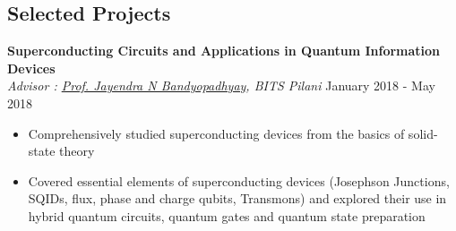 \documentclass[margin, centered, 11pt]{res}
\begin{document}
\begin{resume}


\section{Selected Projects}

\textbf{Superconducting Circuits and Applications in Quantum Information Devices}\\
\emph{Advisor : \href{https://www.bits-pilani.ac.in/Pilani/jayendra/Profile}{Prof. Jayendra N Bandyopadhyay}, BITS Pilani} \hfill January 2018 - May 2018
\begin{itemize}[noitemsep, label=\raisebox{0.35ex}{\tiny$\bullet$}]
\item Comprehensively studied superconducting devices from the basics of solid-state theory
\item Covered essential elements of superconducting devices (Josephson Junctions, SQIDs, flux, phase and charge qubits, Transmons) and explored their use in hybrid quantum circuits, quantum gates and quantum state preparation
\end{itemize}


\end{resume}
\end{document}
